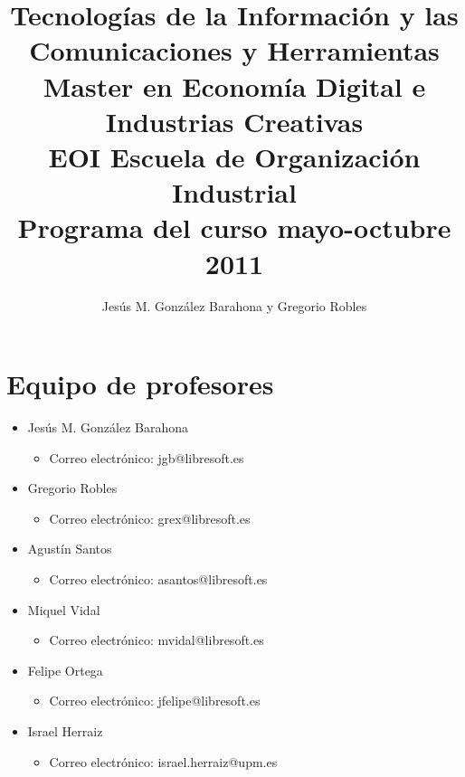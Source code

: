 \documentclass[a4paper,12pt]{article}
\title{Tecnologías de la Información y las Comunicaciones y Herramientas \\
Master en Economía Digital e Industrias Creativas \\
EOI Escuela de Organización Industrial \\
Programa del curso mayo-octubre 2011}
\author{Jesús M. González Barahona y Gregorio Robles}
\begin{document}
\maketitle

\newpage

\tableofcontents

\newpage

\section{Equipo de profesores}

\begin{itemize}
\item Jesús M. González Barahona
  \begin{itemize}
  \item Correo electrónico: jgb@libresoft.es
  \end{itemize}
\item Gregorio Robles
  \begin{itemize}
  \item Correo electrónico: grex@libresoft.es
  \end{itemize}
\item Agustín Santos
  \begin{itemize}
  \item Correo electrónico: asantos@libresoft.es
  \end{itemize}
\item Miquel Vidal
  \begin{itemize}
  \item Correo electrónico: mvidal@libresoft.es
  \end{itemize}
\item Felipe Ortega
  \begin{itemize}
  \item Correo electrónico: jfelipe@libresoft.es
  \end{itemize}
\item Israel Herraiz
  \begin{itemize}
  \item Correo electrónico: israel.herraiz@upm.es
  \end{itemize}
\end{itemize}

\end{document}
